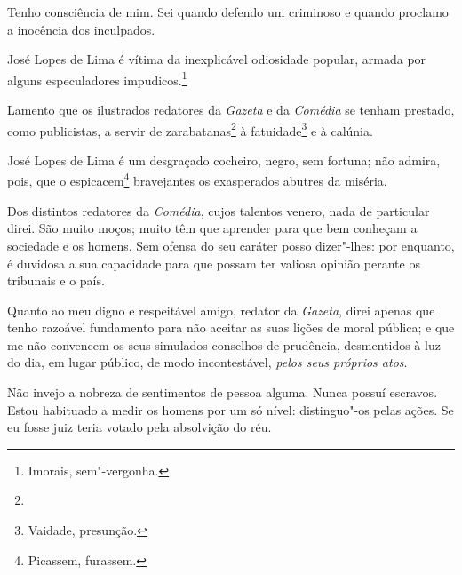 Tenho consciência de mim. Sei quando defendo um criminoso e quando
proclamo a inocência dos inculpados.

José Lopes de Lima é vítima da inexplicável odiosidade popular, armada
por alguns especuladores impudicos.\footnote{Imorais, sem"-vergonha.}

Lamento que os ilustrados redatores da \textit{Gazeta} e da \textit{Comédia}
se tenham prestado, como publicistas, a servir de zarabatanas\footnote{
  } à fatuidade\footnote{
    Vaidade, presunção.} e à calúnia. 

José Lopes de Lima é um desgraçado cocheiro, negro, sem fortuna; não
admira, pois, que o espicacem\footnote{Picassem, furassem.}
bravejantes os exasperados abutres da miséria.

Dos distintos redatores da \textit{Comédia}, cujos talentos venero, nada
de particular direi. São muito moços; muito têm que aprender para que
bem conheçam a sociedade e os homens. Sem ofensa do seu caráter posso
dizer"-lhes: por enquanto, é duvidosa a sua capacidade para que possam
ter valiosa opinião perante os tribunais e o país.

Quanto ao meu digno e respeitável amigo, redator da \textit{Gazeta}, direi
apenas que tenho razoável fundamento para não aceitar as suas lições de
moral pública; e que me não convencem os seus simulados conselhos de
prudência, desmentidos à luz do dia, em lugar público, de modo
incontestável, \emph{pelos seus próprios atos}.

Não invejo a nobreza de sentimentos de pessoa alguma. Nunca possuí
escravos. Estou habituado a medir os homens por um só nível:
distinguo"-os pelas ações. Se eu fosse juiz teria votado pela absolvição
do réu.


